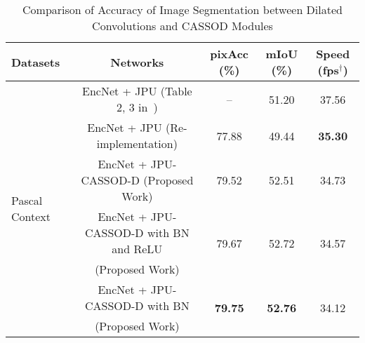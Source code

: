 \documentclass[10pt,twocolumn,letterpaper]{article}
\begin{document}
\begin{table*}
\caption{Comparison of Accuracy of Image Segmentation \cite{Wu19} between Dilated Convolutions and CASSOD Modules}
\begin{center}
\begin{tabular}{l|c|ccc}
\hline
Datasets                                          &  Networks                                                & pixAcc (\%)                     & mIoU (\%)                           & Speed (fps$^{\dag}$)   \\
\hline                                                                                                                                                                                
\multirow{7}{*}{Pascal Context~\cite{Mottaghi14}} &  EncNet + JPU (Table 2, 3 in~\cite{Wu19})                &                         --      &                         51.20               & 37.56 \\
\cline{2-5}
                                                  &  EncNet + JPU (Re-implementation)                        &                         77.88   &                         49.44               & \textbf{35.30} \\
                                                  &  EncNet + JPU-CASSOD-D (Proposed Work)                   &                         79.52   &                         52.51               & 34.73 \\
                                                  &  EncNet + JPU-CASSOD-D with BN and ReLU                  &         \multirow{2}{*}{79.67}  &         \multirow{2}{*}{52.72}              & \multirow{2}{*}{34.57}\\
                                                  & (Proposed Work)                                          &                                 &                                             &  \\
                                                  &  EncNet + JPU-CASSOD-D with BN                           & \multirow{2}{*}{\textbf{79.75}} & \multirow{2}{*}{\textbf{52.76}}             & \multirow{2}{*}{34.12} \\
                                                  & (Proposed Work)                                          &                                 &                                             &\\                                                                       
\hline                                                                                                                                                                               

\end{tabular}
\end{center}
\end{table*}
\end{document}
